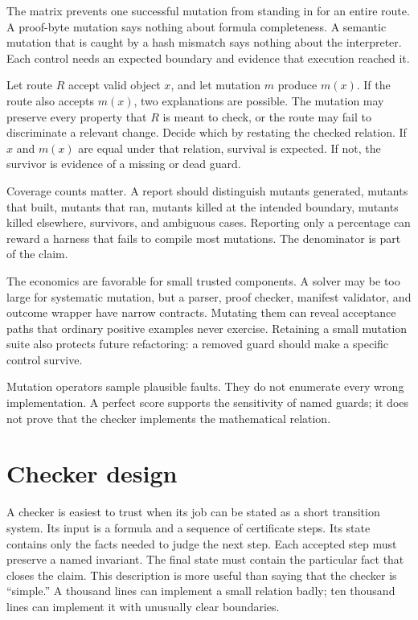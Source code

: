The matrix prevents one successful mutation from standing in for an entire
route. A proof-byte mutation says nothing about formula completeness. A
semantic mutation that is caught by a hash mismatch says nothing about the
interpreter. Each control needs an expected boundary and evidence that
execution reached it.

\begin{proofkit}[title={Why a surviving mutation needs interpretation}]
Let route \(R\) accept valid object \(x\), and let mutation \(m\) produce
\(m(x)\). If the route also accepts \(m(x)\), two explanations are possible.
The mutation may preserve every property that \(R\) is meant to check, or the
route may fail to discriminate a relevant change. Decide which by restating
the checked relation. If \(x\) and \(m(x)\) are equal under that relation,
survival is expected. If not, the survivor is evidence of a missing or dead
guard.
\end{proofkit}

Coverage counts matter. A report should distinguish mutants generated,
mutants that built, mutants that ran, mutants killed at the intended boundary,
mutants killed elsewhere, survivors, and ambiguous cases. Reporting only a
percentage can reward a harness that fails to compile most mutations. The
denominator is part of the claim.

The economics are favorable for small trusted components. A solver may be too
large for systematic mutation, but a parser, proof checker, manifest validator,
and outcome wrapper have narrow contracts. Mutating them can reveal acceptance
paths that ordinary positive examples never exercise. Retaining a small
mutation suite also protects future refactoring: a removed guard should make a
specific control survive.

\begin{warning}[title={A high mutation score is not a soundness theorem}]
Mutation operators sample plausible faults. They do not enumerate every wrong
implementation. A perfect score supports the sensitivity of named guards; it
does not prove that the checker implements the mathematical relation.
\end{warning}

\section{Checker design}

A checker is easiest to trust when its job can be stated as a short transition
system. Its input is a formula and a sequence of certificate steps. Its state
contains only the facts needed to judge the next step. Each accepted step must
preserve a named invariant. The final state must contain the particular fact
that closes the claim. This description is more useful than saying that the
checker is ``simple.'' A thousand lines can implement a small relation badly;
ten thousand lines can implement it with unusually clear boundaries.

